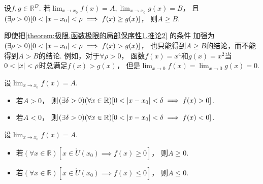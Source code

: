 \begin{corollary}\label{theorem:极限.函数极限的局部保序性1.推论2}
设\(f,g\in\mathbb{R}^D\).
若\(\lim_{x\to x_0} f(x) = A,
\lim_{x\to x_0} g(x) = B\)，
且\((\exists\rho>0)[0<\abs{x-x_0}<\rho \implies f(x) \geq g(x)]\)，
则\(A \geq B\).
\end{corollary}
\begin{remark}
即使把\cref{theorem:极限.函数极限的局部保序性1.推论2} 的条件
加强为\((\exists\rho>0)[0<\abs{x-x_0}<\rho \implies f(x) > g(x)]\)，
也只能得到\(A \geq B\)的结论，而不能得到\(A > B\)的结论.
例如，对于\(\forall\rho>0\)，
函数\(f(x) = x^4\)和\(g(x) = x^2\)当\(0<\abs{x}<\rho\)时总满足\(f(x) > g(x)\)，
但是\(\lim_{x\to0} f(x) = \lim_{x\to0} g(x) = 0\).
\end{remark}


\begin{corollary}[局部保号性]\label{theorem:极限.函数极限的局部保号性1}
设\(\lim_{x \to x_0} f(x) = A\).
\begin{itemize}
	\item 若\(A>0\)，
	则\((\exists\delta>0)
	(\forall x\in\mathbb{R})
	[0<\abs{x-x_0}<\delta \implies f(x)>0]\).
	\item 若\(A<0\)，
	则\((\exists\delta>0)
	(\forall x\in\mathbb{R})
	[0<\abs{x-x_0}<\delta \implies f(x)<0]\).
\end{itemize}
\end{corollary}

\begin{corollary}\label{theorem:极限.函数极限的局部保号性3}
设\(\lim_{x \to x_0} f(x) = A\).
\begin{itemize}
	\item 若\((\forall x\in\mathbb{R})
	[x\in\mathring{U}(x_0) \implies f(x) \geq 0]\)，
	则\(A \geq 0\).
	\item 若\((\forall x\in\mathbb{R})
	[x\in\mathring{U}(x_0) \implies f(x) \leq 0]\)，
	则\(A \leq 0\).
\end{itemize}
\end{corollary}

